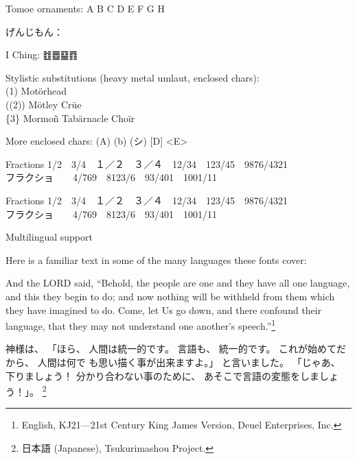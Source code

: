\documentclass[14pt]{extarticle}
\begin{document}
{
Tomoe ornaments: \Large A B C D E F G H
}

げんじもん：{\Large 󱟁󱟆󱟓󱟢}

I Ching: {\Large ䷂䷉䷙䷓}

{
Stylistic substitutions (heavy metal umlaut, enclosed chars):\\
 (1) Motörhead\\
 ((2)) Mötley Crüe\\
 \{3\} Mormoñ Tabärnacle Choïr}

{
More enclosed chars: (A) (b) (シ) [D] <E>}

{
Fractions 1/2~~3/4~~１／２~~３／４~~12/34~~123/45~~9876/4321\\
フラクショ~~~~4/769~~8123/6~~93/401~~1001/11
}

{
Fractions 1/2~~3/4~~１／２~~３／４~~12/34~~123/45~~9876/4321\\
フラクショ~~~~4/769~~8123/6~~93/401~~1001/11
}

\clearpage


\kaku

\Large
Multilingual support

\normalsize

Here is a familiar text in some of the many languages these
fonts cover:

And the LORD said, ``Behold, the people are one and they have all one
language, and this they begin to do; and now nothing will be withheld from
them which they have imagined to do.  Come, let Us go down, and there
confound their language, that they may not understand one another's
speech.''\footnote{English, KJ21---21st Century King James Version, Deuel
Enterprises, Inc.}

神様は、 「ほら、 人間は統一的です。 言語も、 統一的です。
これが始めてだから、 人間は何で
も思い描く事が出来ますよ。」
と言いました。 「じゃあ、 下りましょう！ 分かり合わない事のために、
あそこで言語の変態をしましょう！」。%
\footnote{日本語 (Japanese), Tsukurimashou Project.}
\end{document}
